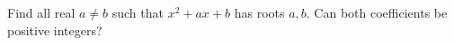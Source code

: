 Find all real $a\ne b$ such that $x^2+ax+b$ has roots $a,b$. Can both coefficients be positive integers?
